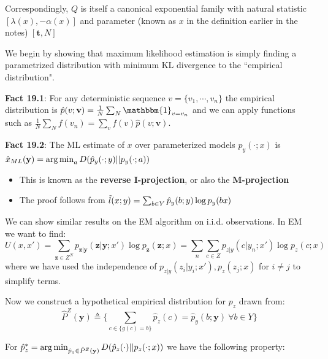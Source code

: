 \documentclass[12pt]{article} %
\begin{document}
Correspondingly, $Q$ is itself a canonical exponential family with natural statistic $[\lambda(x), - \alpha(x)]$ and parameter (known as $x$ in the definition earlier in the notes) $[\mathbf{t}, N]$

\newpage


We begin by showing that maximum likelihood estimation is simply finding a parametrized distribution with minimum KL divergence to the ``empirical distribution".

\textbf{Fact 19.1}: For any deterministic sequence $v = \{v_1, \cdots, v_n\}$ the empirical distribution is $\hat{p}(v;\mathbf{v}) = \frac{1}{N} \sum_N \mathbbm{1}_{v = v_n}$ and we can apply functions such as $\frac{1}{N} \sum_N f(v_n) = \sum_v f(v) \hat{p}(v;\mathbf{v})$.

\textbf{Fact 19.2}: The ML estimate of $x$ over parameterized models $p_y(\cdot;x)$ is $\hat{x}_{ML}(\mathbf{y}) = \operatorname*{arg\,min}_a D(\hat{p}_y(\cdot;y) || p_y(\cdot;a))$
\begin{itemize}[topsep=-1pt, itemsep=-1pt]
    \item This is known as the \textbf{reverse I-projection}, or also the \textbf{M-projection}
    \item The proof follows from $\Tilde{l}(x;y) = \sum_{b \in Y} \hat{p}_y(b;y) \log p_y(bx)$ 
\end{itemize}
\separate

We can show similar results on the EM algorithm on i.i.d. observations. In EM we want to find:
\begin{equation*}
    U(x,x') 
    = \sum_{\mathbf{z} \in Z^N} p_{\mathbf{z}|\mathbf{y}}(\mathbf{z}|\mathbf{y};x') 
    \log p_{\mathbf{z}}(\mathbf{z};x)
    =
    \sum_n \sum_{c \in Z} p_{z|y}(c|y_n;x') \log p_z(c;x)
\end{equation*}
where we have used the independence of $p_{z|y}(z_i|y_i;x'), p_z(z_j;x)$ for $i \neq j$ to simplify terms.

Now we construct a hypothetical empirical distribution for $p_z$ drawn from: $$\hat{P}^Z(\mathbf{y}) \triangleq \{\sum_{c \in \{g(c) = b\}} \hat{p}_z(c) = \hat{p}_y(b;\mathbf{y}) \ \forall b \in Y\}$$

For $\hat{p}_z^* = \operatorname*{arg\,min}_{\hat{p}_z \in \hat{P}^Z(\mathbf{y})} D(\hat{p}_z(\cdot) || p_z(\cdot;x))$ we have the following property:
\end{document}
